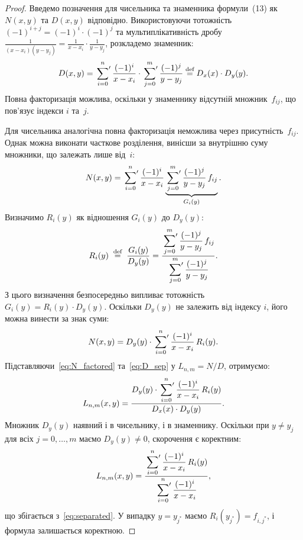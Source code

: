 \begin{proof}
	Введемо позначення для чисельника та знаменника формули~(13) як $N(x,y)$ та $D(x,y)$
	відповідно. Використовуючи тотожність $(-1)^{i+j} = (-1)^i \cdot (-1)^j$
	та мультиплікативність дробу
	$\frac{1}{(x-x_i)(y-y_j)} = \frac{1}{x-x_i}\cdot\frac{1}{y-y_j}$,
	розкладемо знаменник:
	\begin{equation}
		D(x,y)
		= \sideset{}{'}\sum_{i=0}^{n} \frac{(-1)^{i}}{x - x_i}
		\cdot \sideset{}{'}\sum_{j=0}^{m} \frac{(-1)^{j}}{y - y_j}
		\stackrel{\text{def}}{=} D_x(x) \cdot D_y(y).
		\label{eq:D_sep}
	\end{equation}
	Повна факторизація можлива, оскільки у знаменнику відсутній
	множник~$f_{ij}$, що пов'язує індекси $i$ та~$j$.
	
	Для чисельника аналогічна повна факторизація неможлива через
	присутність~$f_{ij}$. Однак можна виконати часткове розділення, винісши
	за внутрішню суму множники, що залежать лише від~$i$:
	\begin{equation}
		N(x,y) = \sideset{}{'}\sum_{i=0}^{n}
		\frac{(-1)^{i}}{x - x_i}
		\underbrace{\sideset{}{'}\sum_{j=0}^{m}
			\frac{(-1)^{j}}{y - y_j}\, f_{ij}}_{G_i(y)}.
		\label{eq:N_partial}
	\end{equation}
	Визначимо $R_i(y)$ як відношення $G_i(y)$ до $D_y(y)$:
	\begin{equation}
		R_i(y) \;\stackrel{\text{def}}{=}\; \frac{G_i(y)}{D_y(y)} 
		= \frac{\sideset{}{'}\sum\limits_{j=0}^{m} \dfrac{(-1)^{j}}{y - y_j}\, f_{ij}}{\sideset{}{'}\sum\limits_{j=0}^{m} \dfrac{(-1)^{j}}{y - y_j}}.
		\label{eq:Ri_def}
	\end{equation}
	З цього визначення безпосередньо випливає тотожність $G_i(y) = R_i(y) \cdot D_y(y)$. Оскільки $D_y(y)$ не залежить від
	індексу $i$, його можна винести за знак суми:
	\begin{equation}
		N(x,y) = D_y(y) \cdot \sideset{}{'}\sum_{i=0}^{n}
		\frac{(-1)^{i}}{x - x_i}\, R_i(y).
		\label{eq:N_factored}
	\end{equation}
	Підставляючи~\eqref{eq:N_factored} та~\eqref{eq:D_sep} у $L_{n,m} = N/D$,
	отримуємо:
	\begin{equation}
		L_{n,m}(x,y) = \frac{D_y(y) \cdot \sideset{}{'}\sum\limits_{i=0}^{n}
			\dfrac{(-1)^{i}}{x - x_i}\, R_i(y)}
		{D_x(x) \cdot D_y(y)}.
	\end{equation}
	Множник $D_y(y)$ наявний і в чисельнику, і в знаменнику. Оскільки при
	$y \neq y_j$ для всіх $j = 0, \ldots, m$ маємо $D_y(y) \neq 0$,
	скорочення є коректним:
	\begin{equation}
		L_{n,m}(x,y) = \frac{\sideset{}{'}\sum\limits_{i=0}^{n}
			\dfrac{(-1)^{i}}{x - x_i}\, R_i(y)}
		{\sideset{}{'}\sum\limits_{i=0}^{n}
			\dfrac{(-1)^{i}}{x - x_i}},
	\end{equation}
	що збігається з~\eqref{eq:separated}. У випадку $y = y_{j^*}$ маємо
	$R_i(y_{j^*}) = f_{i,j^*}$, і формула залишається коректною.
\end{proof}

